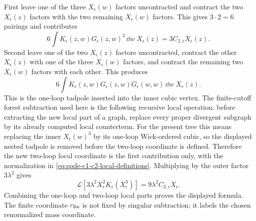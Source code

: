 First leave one of the three \(X_\epsilon(w)\) factors uncontracted and
contract the two \(X_\epsilon(z)\) factors with the two remaining
\(X_\epsilon(w)\) factors.  This gives \(3\cdot2=6\) pairings and contributes
\[
  6
  \int K_\epsilon(z,w)G_\epsilon(z,w)^2\,\dd w\;X_\epsilon(z)
  =
  3C_{2,\epsilon}X_\epsilon(z).
\]
Second leave one of the two \(X_\epsilon(z)\) factors uncontracted, contract
the other \(X_\epsilon(z)\) with one of the three \(X_\epsilon(w)\) factors,
and contract the remaining two \(X_\epsilon(w)\) factors with each other.
This produces
\[
  6
  \int K_\epsilon(z,w)G_\epsilon(z,w)G_\epsilon(w,w)\,\dd w\;X_\epsilon(z).
\]
This is the one-loop tadpole inserted into the inner cubic vertex.  The
finite-cutoff forest subtraction used here is the following recursive local
operation: before extracting the new local part of a graph, replace every
proper divergent subgraph by its already computed local counterterm.  For the
present tree this means replacing the inner \(X_\epsilon(w)^3\) by its
one-loop Wick-ordered cubic, so the displayed nested tadpole is removed
before the two-loop coordinate is defined.  Therefore the new two-loop local
coordinate is the first contribution only, with the normalization in
\eqref{eq:spde-c1-c2-local-definitions}.  Multiplying by the outer factor
\(3\lambda^2\) gives
\[
  \mathcal L[3\lambda^2X_\epsilon^2K_\epsilon(X_\epsilon^3)]
  =
  9\lambda^2C_{2,\epsilon}X_\epsilon .
\]
Combining the one-loop and two-loop local parts proves the displayed
formula.  The finite coordinate \(c_{\rm fin}\) is not fixed by singular
subtraction; it labels the chosen renormalized mass coordinate.


